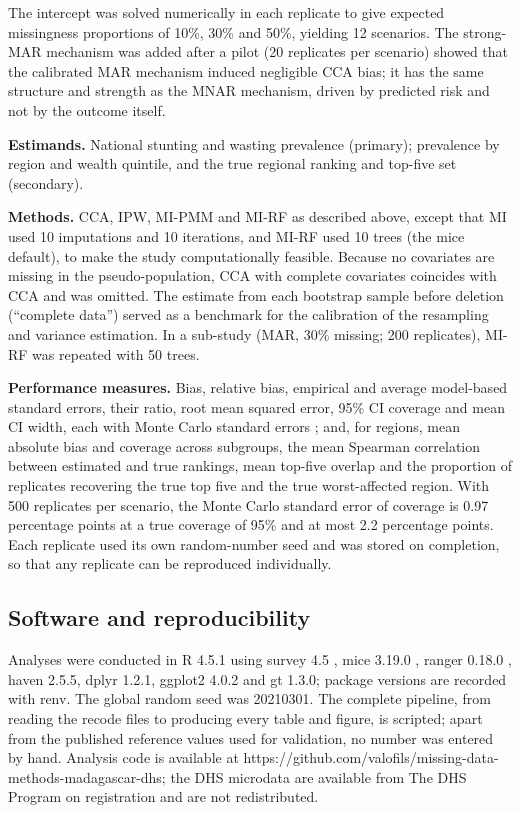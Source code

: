 \documentclass[11pt,a4paper]{article}
\begin{document}
The intercept was solved numerically in each replicate to give expected
missingness proportions of 10\%, 30\% and 50\%, yielding 12 scenarios.
The strong-MAR mechanism was added after a pilot (20 replicates per
scenario) showed that the calibrated MAR mechanism induced negligible
CCA bias; it has the same structure and strength as the MNAR mechanism,
driven by predicted risk and not by the outcome itself.

\textbf{Estimands.} National stunting and wasting prevalence (primary);
prevalence by region and wealth quintile, and the true regional ranking
and top-five set (secondary).

\textbf{Methods.} CCA, IPW, MI-PMM and MI-RF as described above, except
that MI used 10 imputations and 10 iterations, and MI-RF used 10 trees
(the mice default), to make the study computationally feasible. Because
no covariates are missing in the pseudo-population, CCA with complete
covariates coincides with CCA and was omitted. The estimate from each
bootstrap sample before deletion (``complete data'') served as a
benchmark for the calibration of the resampling and variance estimation.
In a sub-study (MAR, 30\% missing; 200 replicates), MI-RF was repeated
with 50 trees.

\textbf{Performance measures.} Bias, relative bias, empirical and
average model-based standard errors, their ratio, root mean squared
error, 95\% CI coverage and mean CI width, each with Monte Carlo
standard errors \cite{morris2019using}; and, for regions, mean absolute
bias and coverage across subgroups, the mean Spearman correlation
between estimated and true rankings, mean top-five overlap and the
proportion of replicates recovering the true top five and the true
worst-affected region. With 500 replicates per scenario, the Monte Carlo
standard error of coverage is 0.97 percentage points at a true coverage
of 95\% and at most 2.2 percentage points. Each replicate used its own
random-number seed and was stored on completion, so that any replicate
can be reproduced individually.

\subsection{Software and
reproducibility}\label{software-and-reproducibility}

Analyses were conducted in R 4.5.1 \cite{rcore2025r} using survey 4.5
\cite{lumley2004analysis}, mice 3.19.0 \cite{vanbuuren2011mice}, ranger
0.18.0 \cite{wright2017ranger}, haven 2.5.5, dplyr 1.2.1, ggplot2 4.0.2
and gt 1.3.0; package versions are recorded with renv. The global random
seed was 20210301. The complete pipeline, from reading the recode files
to producing every table and figure, is scripted; apart from the
published reference values used for validation, no number was entered by
hand. Analysis code is available at
https://github.com/valofils/missing-data-methods-madagascar-dhs; the DHS
microdata are available from The DHS Program on registration and are not
redistributed.
\end{document}
